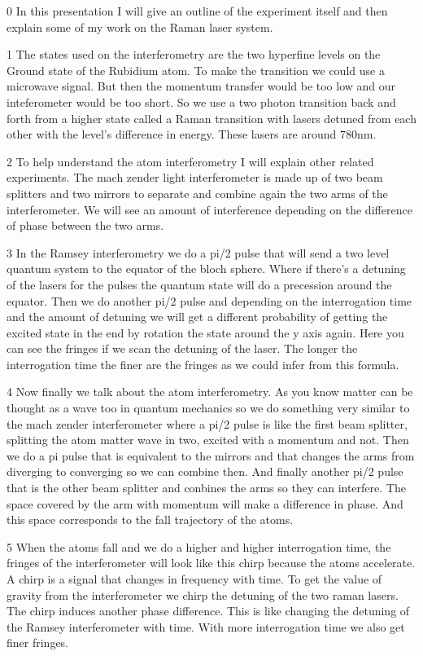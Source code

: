 0 In this presentation I will give an outline of the experiment itself and then explain some of my work on the Raman laser system.

1 The states used on the interferometry are the two hyperfine levels on the Ground state of the Rubidium atom. To make the transition we could use a microwave signal. But then the momentum transfer would be too low and our inteferometer would be too short. So we use a two photon transition back and forth from a higher state called a Raman transition with lasers detuned from each other with the level's difference in energy. These lasers are around 780nm.

2 To help understand the atom interferometry I will explain other related experiments. The mach zender light interferometer is made up of two beam splitters and two mirrors to separate and combine again the two arms of the interferometer. We will see an amount of interference depending on the difference of phase between the two arms.

3 In the Ramsey interferometry we do a pi/2 pulse that will send a two level quantum system to the equator of the bloch sphere. Where if there's a detuning of the lasers for the pulses the quantum state will do a precession around the equator. Then we do another pi/2 pulse and depending on the interrogation time and the amount of detuning we will get a different probability of getting the excited state in the end by rotation the state around the y axis again. Here you can see the fringes if we scan the detuning of the laser. The longer the interrogation time the finer are the fringes as we could infer from this formula.

4 Now finally we talk about the atom interferometry. As you know matter can be thought as a wave too in quantum mechanics so we do something very similar to the mach zender interferometer where a pi/2 pulse is like the first beam splitter, splitting the atom matter wave in two, excited with a momentum and not. Then we do a pi pulse that is equivalent to the mirrors and that changes the arms from diverging to converging so we can combine then. And finally another pi/2 pulse that is the other beam splitter and conbines the arms so they can interfere. The space covered by the arm with momentum will make a difference in phase. And this space corresponds to the fall trajectory of the atoms.

5 When the atoms fall and we do a higher and higher interrogation time, the fringes of the interferometer will look like this chirp because the atoms accelerate. A chirp is a signal that changes in frequency with time. To get the value of gravity from the interferometer we chirp the detuning of the two raman lasers. The chirp induces another phase difference. This is like changing the detuning of the Ramsey interferometer with time. With more interrogation time we also get finer fringes.

